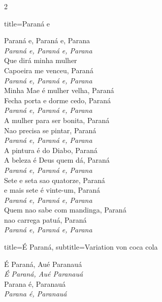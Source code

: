 \documentclass[fontsize=14pt, paper=a4, twoside, DIV=20]{scrreprt} %
\begin{document}
\begin{multicols*}{2}
\begin{song}{title={Paraná e}}
        \begin{verse*}
            Paraná e, Paraná e, Parana\\
            \textit{Paraná e, Paraná e, Parana}\\
            Que dirá minha mulher\\
            Capoeira me venceu, Paraná\\
            \textit{Paraná e, Paraná e, Parana}\\
            Minha Mae é mulher velha, Paraná\\
            Fecha porta e dorme cedo, Paraná\\
            \textit{Paraná e, Paraná e, Parana}\\
            A mulher para ser bonita, Paraná\\
            Nao precisa se pintar, Paraná\\
            \textit{Paraná e, Paraná e, Parana}\\
            A pintura é do Diabo, Paraná\\
            A beleza é Deus quem dá, Paraná\\
            \textit{Paraná e, Paraná e, Parana}\\
            Sete e seta sao quatorze, Paraná\\
            e mais sete é vinte-um, Paraná\\
            \textit{Paraná e, Paraná e, Parana}\\
            Quem nao sabe com mandinga, Paraná\\
            nao carrega patuá, Paraná\\
            \textit{Paraná e, Paraná e, Parana}\\
        \end{verse*}
\end{song}

\begin{song}{title={É Paraná}, subtitle={Variation von coca cola}}
        \begin{verse*}
            É Paraná, Aué Paranauá\\
            \textit{É Paraná, Aué Paranauá}\\
            Parana é, Paranauá\\
            \textit{Parana é, Paranauá}
    \end{verse*}
\end{song}


\end{multicols*}
\end{document}
